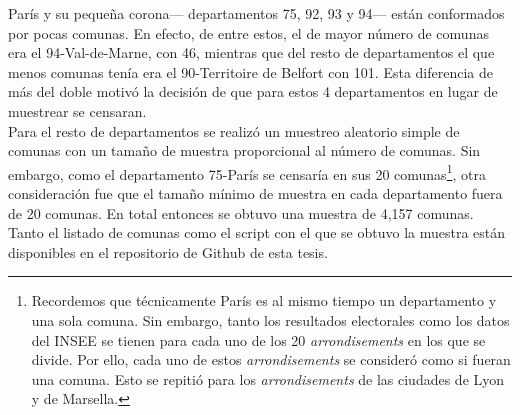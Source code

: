 París y su pequeña corona--- departamentos 75, 92, 93 y 94--- están conformados por pocas comunas. En efecto, de entre estos, el de mayor número de comunas era el 94-Val-de-Marne, con 46, mientras que del resto de departamentos el que menos comunas tenía era el 90-Territoire de Belfort con 101. Esta diferencia de más del doble motivó la decisión de que para estos 4 departamentos en lugar de muestrear se censaran.\\

Para el resto de departamentos se realizó un muestreo aleatorio simple de comunas con un tamaño de muestra proporcional al número de comunas. Sin embargo, como el departamento 75-París se censaría en sus 20 comunas\footnote{Recordemos que técnicamente París es al mismo tiempo un departamento y una sola comuna. Sin embargo, tanto los resultados electorales como los datos del INSEE se tienen para cada uno de los 20 \textit{arrondisements} en los que se divide. Por ello, cada uno de estos \textit{arrondisements} se consideró como si fueran una comuna. Esto se repitió para los \textit{arrondisements} de las ciudades de Lyon y de Marsella.}, otra consideración fue que el tamaño mínimo de muestra en cada departamento fuera de 20 comunas. En total entonces se obtuvo una muestra de 4,157 comunas. Tanto el listado de comunas como el script con el que se obtuvo la muestra están disponibles en el repositorio de Github de esta tesis.\\
 
